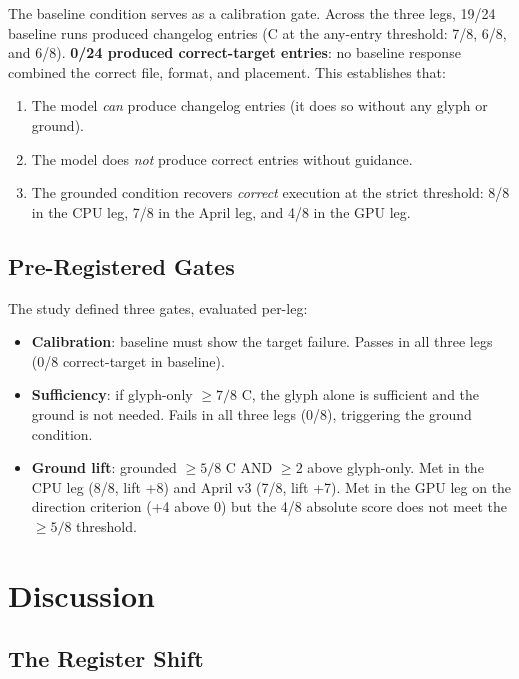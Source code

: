 \documentclass[11pt,a4paper]{article}
\begin{document}
The baseline condition serves as a calibration gate. Across the three legs,
19/24 baseline runs produced changelog entries (C at the any-entry threshold:
7/8, 6/8, and 6/8). \textbf{0/24 produced correct-target entries}: no baseline
response combined the correct file, format, and placement. This
establishes that:

\begin{enumerate}
  \item The model \emph{can} produce changelog entries (it does so without any
    glyph or ground).
  \item The model does \emph{not} produce correct entries without guidance.
    \item The grounded condition recovers \emph{correct} execution at the strict
    threshold: 8/8 in the CPU leg, 7/8 in the April leg, and 4/8 in the GPU
    leg.
\end{enumerate}

\subsection{Pre-Registered Gates}\label{sec:gates}

The study defined three gates, evaluated per-leg:

\begin{itemize}
  \item \textbf{Calibration}: baseline must show the target failure. Passes in
    all three legs (0/8 correct-target in baseline).
  \item \textbf{Sufficiency}: if glyph-only $\geq 7/8$ C, the glyph alone is
    sufficient and the ground is not needed. Fails in all three legs (0/8),
    triggering the ground condition.
  \item \textbf{Ground lift}: grounded $\geq 5/8$ C AND $\geq 2$ above
    glyph-only. Met in the CPU leg (8/8, lift +8) and April v3 (7/8, lift +7).
    Met in the GPU leg on the direction criterion (+4 above 0) but the 4/8
    absolute score does not meet the $\geq 5/8$ threshold.
\end{itemize}

\section{Discussion}

\subsection{The Register Shift}
\end{document}
